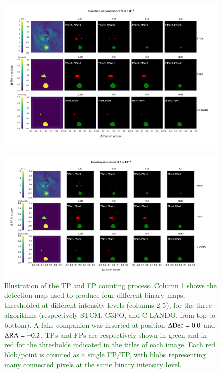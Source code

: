 \documentclass[referee]{aa} %
\newcommand{\newchange}[1]{\textcolor{darkgreen}{#1}}
\begin{document}
\begin{figure}[t]
    \centering
    \includegraphics[width=\textwidth]{Fig3_Sep2023.png}
\end{figure}
\begin{figure}[t]
    \centering
    \includegraphics[width=\textwidth]{Fig3_Mar2024_referee.png}
    \caption{\newchange{Illustration of the TP and FP counting process. Column 1 shows the detection map used to produce four different binary maps, thresholded at different intensity levels (columns 2-5), for the three algorithms (respectively STCM, C3PO, and C-LANDO, from top to bottom). A fake companion was inserted at position $\Delta{\rm Dec}=0.0$ and $\Delta{\rm RA} = -0.2$. TPs and FPs are respectively shown in green and in red for the thresholds indicated in the titles of each image. Each red blob/point is counted as a single FP/TP, with blobs representing many connected pixels at the same binary intensity level.}}
    \label{fig:sample_detmaps}
\end{figure}
\end{document}

